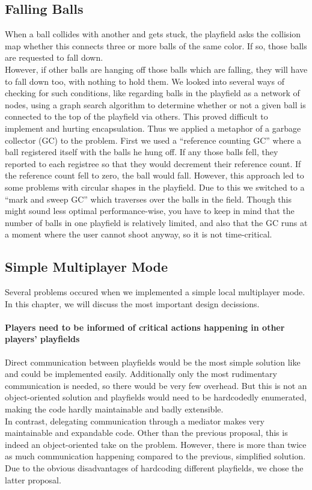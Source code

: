 \subsection{Falling Balls}
When a ball collides with another and gets stuck, the playfield asks the 
collision map whether this connects three or more balls of the same color.
If so, those balls are requested to fall down.\\
However, if other balls are hanging off those balls which are falling, 
they will have to fall down too, with nothing to hold them. We looked 
into several ways of checking for such conditions, like regarding balls in the 
playfield as a network of nodes, using a graph search algorithm to determine 
whether or not a given ball is connected to the top of the playfield via 
others. This proved difficult to implement and hurting encapsulation. Thus 
we applied a metaphor of a garbage collector (GC) to the problem. First we used a
``reference counting GC'' where a ball registered itself with the balls he hung 
off. If any those balls fell, they reported to each registree so that they would 
decrement their reference count. If the reference count fell to zero, the ball 
would fall. However, this approach led to some problems with circular shapes 
in the playfield. Due to this we switched to a ``mark and sweep GC'' which traverses
over the balls in the field. Though this might sound less optimal performance-wise,
you have to keep in mind that the number of balls in one playfield is relatively limited, 
and also that the GC runs at a moment where the user cannot shoot anyway, so 
it is not time-critical.

\subsection{Simple Multiplayer Mode}
%
Several problems occured when we implemented a simple local multiplayer mode. In this chapter, 
we will discuss the most important design decissions.

%
  \paragraph{Players need to be informed of critical actions happening in other players' playfields}
    Direct communication between playfields would be the most simple solution like and 
    could be implemented easily. Additionally only the most rudimentary communication is needed,
    so there would be very few overhead. But this is not an object-oriented solution and playfields 
    would need to be hardcodedly enumerated, making the code hardly maintainable and badly extensible.\\
    In contrast, delegating communication through a mediator makes very maintainable and
    expandable code. Other than the previous proposal, this is indeed an object-oriented 
    take on the problem. However, there is more than twice as much communication happening 
    compared to the previous, simplified solution.\\
    Due to the obvious disadvantages of hardcoding different playfields, we chose the latter proposal.\\

